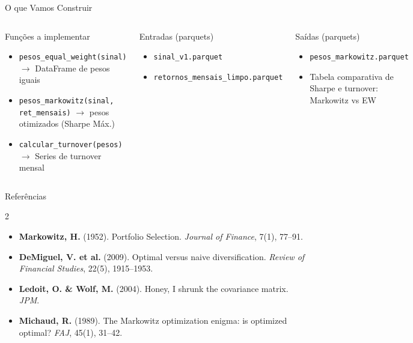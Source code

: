 \documentclass[aspectratio=169,12pt]{beamer}
\begin{document}
\begin{frame}[fragile]{O que Vamos Construir}
\begin{columns}[T]
\begin{block}{Funções a implementar}
\begin{itemize}
  \item \texttt{pesos\_equal\_weight(sinal)} $\to$ DataFrame de pesos iguais
  \item \texttt{pesos\_markowitz(sinal, ret\_mensais)} $\to$ pesos otimizados (Sharpe Máx.)
  \item \texttt{calcular\_turnover(pesos)} $\to$ Series de turnover mensal
\end{itemize}
\end{block}
\begin{block}{Entradas (parquets)}
\begin{itemize}
  \item \texttt{sinal\_v1.parquet}
  \item \texttt{retornos\_mensais\_limpo.parquet}
\end{itemize}
\end{block}
\vspace{.4em}
\begin{exampleblock}{Saídas (parquets)}
\begin{itemize}
  \item \texttt{pesos\_markowitz.parquet}
  \item Tabela comparativa de Sharpe e turnover: Markowitz vs EW
\end{itemize}
\end{exampleblock}
\end{columns}
\end{frame}

\begin{frame}[fragile]{Referências}
\begin{multicols}{2}
\tiny
\begin{itemize}
  \item \textbf{Markowitz, H.} (1952). Portfolio Selection. \textit{Journal of Finance}, 7(1), 77--91.
  \item \textbf{DeMiguel, V. et al.} (2009). Optimal versus naive diversification. \textit{Review of Financial Studies}, 22(5), 1915--1953.
  \item \textbf{Ledoit, O. \& Wolf, M.} (2004). Honey, I shrunk the covariance matrix. \textit{JPM}.
  \item \textbf{Michaud, R.} (1989). The Markowitz optimization enigma: is optimized optimal? \textit{FAJ}, 45(1), 31--42.
\end{itemize}
\end{multicols}
\end{frame}
\end{document}
